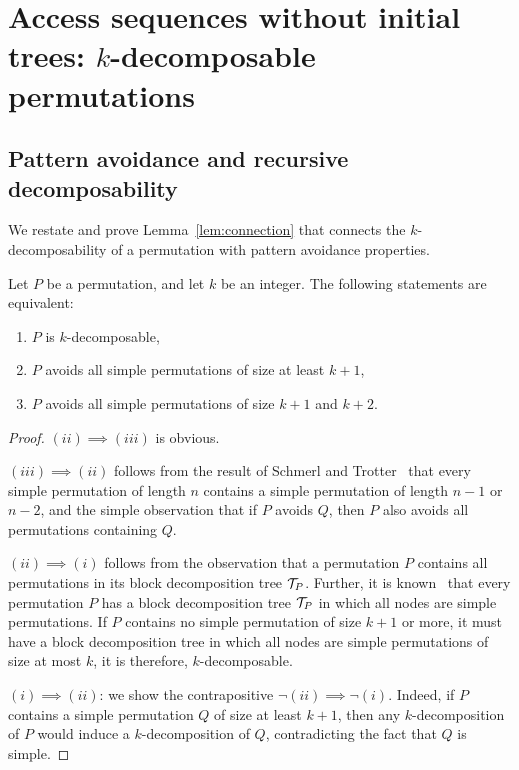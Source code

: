
\section{Access sequences without initial trees: $k$-decomposable permutations}
\label{sec:block_linear}



\subsection{Pattern avoidance and recursive decomposability} 
\label{sec:connection-ext}
We restate and prove Lemma~\ref{lem:connection} that connects  the $k$-decomposability of a permutation with pattern avoidance properties.

\begin{lemma}
\label{lem:connection-ext}
Let $P$ be a permutation, and let $k$ be an integer. The following statements are equivalent:
\begin{enumerate}[label={{(}\roman*{)}}]
\item $P$ is $k$-decomposable,
\item $P$ avoids all simple permutations of size at least $k+1$,
\item $P$ avoids all simple permutations of size $k+1$ and $k+2$.
\end{enumerate}
\end{lemma}

\begin{proof}
$(ii) \implies (iii)$ is obvious.

$(iii) \implies (ii)$ follows from the result of Schmerl and Trotter~\cite{schmerl_trotter} that every simple permutation of length $n$ contains a simple permutation of length $n-1$ or $n-2$, and the simple observation that if $P$ avoids $Q$, then $P$ also avoids all permutations containing $Q$.

$(ii) \implies (i)$ follows from the observation that a permutation $P$ contains all permutations in its block decomposition tree ${\mathcal T}_P$. Further, it is known~\cite{brignall} that every permutation $P$ has a block decomposition tree ${\mathcal T}_P$ in which all nodes are simple permutations. If $P$ contains no simple permutation of size $k+1$ or more, it must have a block decomposition tree in which all nodes are simple permutations of size at most $k$, it is therefore, $k$-decomposable.

$(i) \implies (ii)$: we show the contrapositive $\neg(ii) \implies \neg(i)$. 
Indeed, if $P$ contains a simple permutation $Q$ of size at least $k+1$, then any $k$-decomposition of $P$ would induce a $k$-decomposition of $Q$, contradicting the fact that $Q$ is simple.
\end{proof}


